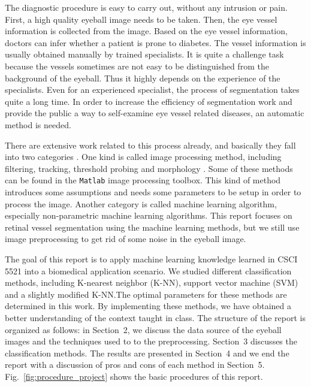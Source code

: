 \documentclass[12pt, notitlepage]{article}
\newcommand{\fref}[1]{Fig.~\ref{#1}}
\begin{document}
The diagnostic procedure is easy to carry out, without any intrusion or pain.  First, a high quality eyeball image needs to be taken. Then, the eye vessel information is collected from the image. Based on the eye vessel information, doctors can infer whether a patient is prone to diabetes.  The vessel information is usually obtained manually by trained specialists.  It is quite a challenge task because the vessels sometimes are not easy to be distinguished from the background of the eyeball.  Thus it highly depends on the experience of the specialists.  Even for an experienced specialist, the process of segmentation takes quite a long time.  In order to increase the efficiency of segmentation work and provide the public a way to self-examine eye vessel related diseases, an automatic method is needed.  
  
There are extensive work related to this process already, and basically they fall into two categories \cite{marin2011new}.  One kind is called image processing method, including filtering, tracking, threshold probing and morphology \cite{marin2011new}. Some of these methods can be found in the \verb|Matlab| image processing toolbox.   This kind of method introduces some assumptions and needs some parameters to be setup in order to process the image. Another category is called machine learning algorithm, especially non-parametric machine learning algorithms.  This report focuses on retinal vessel segmentation using the machine learning methods, but we still use image preprocessing to get rid of some noise in the eyeball image.  

  
The goal of this report is to apply machine learning knowledge learned in CSCI 5521 into a biomedical application scenario.  We studied different classification methods, including K-nearest neighbor (K-NN), support vector machine (SVM) and a slightly modified K-NN.The optimal parameters for these methods are determined in this work. By implementing these methods, we have obtained a better understanding of the context taught in class.  The structure of the report is organized as follows: in Section~2, we discuss the data source of the eyeball images and the techniques used to to the preprocessing. Section~3 discusses the classification methods. The results are presented in Section~4 and we end the report with a discussion of pros and cons of each method in Section~5.  \fref{fig:procedure_project} shows the basic procedures of this report. 
 
\end{document}
